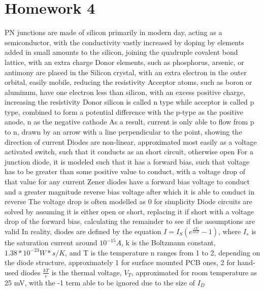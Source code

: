 \documentclass[11 pt, twoside]{article}
\newenvironment{outline*}
{
	\begin{outline}[enumerate]
	}
	{\end{outline}
}
\begin{document}
\section{Homework 4}
\begin{outline*}
\1 PN junctions are made of silicon primarily in modern day, acting as a semiconductor, with the conductivity vastly increased by doping by elements added in small amounts to the silicon, joining the quadruple covalent bond lattice, with an extra charge
	\2 Donor elements, such as phosphorus, arsenic, or antimony are placed in the Silicon crystal, with an extra electron in the outer orbital, easily mobile, reducing the resistivity
	\2 Acceptor atoms, such as boron or aluminum, have one electron less than silicon, with an excess positive charge, increasing the resistivity
	\2 Donor silicon is called n type while acceptor is called p type, combined to form a potential difference with the p-type as the positive anode, n as the negative cathode
		\3 As a result, current is only able to flow from p to n, drawn by an arrow with a line perpendicular to the point, showing the direction of current
\1 Diodes are non-linear, approximated most easily as a voltage activated switch, such that it conducts as an short circuit, otherwise open
	\2 For a junction diode, it is modeled such that it has a forward bias, such that voltage has to be greater than some positive value to conduct, with a voltage drop of that value for any current
		\3 Zener diodes have a forward bias voltage to conduct and a greater magnitude reverse bias voltage after which it is able to conduct in reverse
		\3 The voltage drop is often modelled as 0 for simplicity
	\2 Diode circuits are solved by assuming it is either open or short, replacing it if short with a voltage drop of the forward bias, calculating the remainder to see if the assumptions are valid
	\2 In reality, diodes are defined by the equation $I = I_S(e^{\frac{eV}{nkT}} - 1)$, where $I_s$ is the saturation current around $10^{-15} A$, k is the Boltzmann constant, $1.38 * 10^{-23} W*s/K$, and T is the temperature
		\3 n ranges from 1 to 2, depending on the diode structure, approximately 1 for surface mounted PCB ones, 2 for hand-used diodes
		\3 $\frac{kT}{e}$ is the thermal voltage, $V_T$, approximated for room temperature as 25 mV, with the -1 term able to be ignored due to the size of $I_D$
	\2 
\end{outline*}
\end{document}
